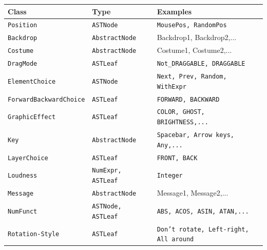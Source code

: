 \begin{table}[hbtp]
    \begin{tabular}[t]{lll}
    	\toprule
    	Class & Type & Examples \\
    	\midrule
    	\vspace{10pt}
    		\texttt{Position} & \texttt{ASTNode} & \texttt{MousePos, RandomPos} \\
    		\vspace{10pt} 
    		\texttt{Backdrop} & \texttt{AbstractNode} & Backdrop1, Backdrop2,... \\
    		\vspace{10pt} 
    		\texttt{Costume} & \texttt{AbstractNode} & Costume1, Costume2,... \\
    		\vspace{10pt}
    		\texttt{DragMode} & \texttt{ASTLeaf} & \texttt{Not\_DRAGGABLE, DRAGGABLE} \\
    		\vspace{10pt}
   		\texttt{ElementChoice} & \texttt{ASTNode} & \texttt{Next, Prev, Random, WithExpr} \\
   		\vspace{10pt}
    		\texttt{ForwardBackwardChoice} & \texttt{ASTLeaf} & \texttt{FORWARD, BACKWARD} \\
    		\vspace{10pt}
    		\texttt{GraphicEffect} & \texttt{ASTLeaf} & \texttt{COLOR, GHOST, BRIGHTNESS,...} \\
    		\vspace{10pt}
    		\texttt{Key} & \texttt{AbstractNode} & \texttt{Spacebar, Arrow keys, Any,...} \\
    		\vspace{10pt} 
   	 	\texttt{LayerChoice} & \texttt{ASTLeaf} & \texttt{FRONT, BACK} \\ 
   	 	\vspace{10pt}
    		\texttt{Loudness} & \texttt{NumExpr, ASTLeaf} & \texttt{Integer} \\
    		\vspace{10pt}
   		\texttt{Message} & \texttt{AbstractNode} & Message1, Message2,... \\
   		\vspace{10pt}
    		\texttt{NumFunct} & \texttt{ASTNode, ASTLeaf} & \texttt{ABS, ACOS, ASIN, ATAN,...} \\
    		\vspace{10pt} 
   		\texttt{Rotation-Style} & \texttt{ASTLeaf} & \parbox[t]{7cm}{\texttt{Don't rotate, Left-right,\\ All around}} \\

\end{tabular}
\end{table}
